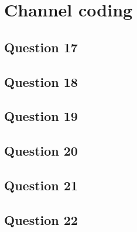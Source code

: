 \documentclass[]{template}
\begin{document}
\section{Channel coding}

    \subsection{Question 17}

    \subsection{Question 18}

    \subsection{Question 19}

    \subsection{Question 20}

    \subsection{Question 21}

    \subsection{Question 22}
\end{document}
